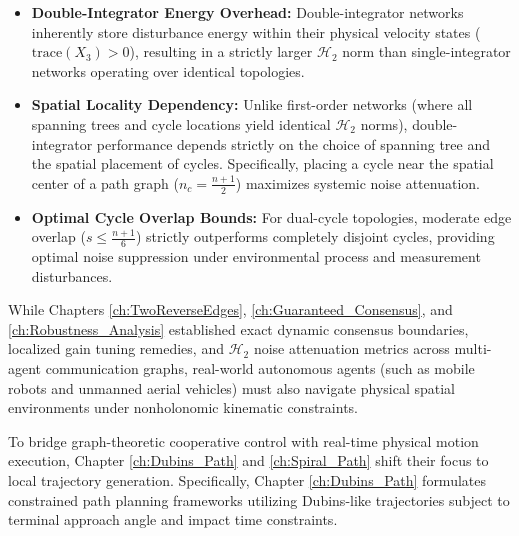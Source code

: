 \begin{itemize}
    \item \textbf{Double-Integrator Energy Overhead:} Double-integrator networks inherently store disturbance energy within their physical velocity states ($\text{trace}(X_3) > 0$), resulting in a strictly larger $\mathcal{H}_2$ norm than single-integrator networks operating over identical topologies.
    \item \textbf{Spatial Locality Dependency:} Unlike first-order networks (where all spanning trees and cycle locations yield identical $\mathcal{H}_2$ norms), double-integrator performance depends strictly on the choice of spanning tree and the spatial placement of cycles. Specifically, placing a cycle near the spatial center of a path graph ($n_c = \frac{n+1}{2}$) maximizes systemic noise attenuation.
    \item \textbf{Optimal Cycle Overlap Bounds:} For dual-cycle topologies, moderate edge overlap ($s \le \frac{n+1}{6}$) strictly outperforms completely disjoint cycles, providing optimal noise suppression under environmental process and measurement disturbances.
\end{itemize}
\vspace{0.5em}
\noindent %
While Chapters \ref{ch:TwoReverseEdges}, \ref{ch:Guaranteed_Consensus}, and \ref{ch:Robustness_Analysis} established exact dynamic consensus boundaries, localized gain tuning remedies, and $\mathcal{H}_2$ noise attenuation metrics across multi-agent communication graphs, real-world autonomous agents (such as mobile robots and unmanned aerial vehicles) must also navigate physical spatial environments under nonholonomic kinematic constraints.

To bridge graph-theoretic cooperative control with real-time physical motion execution, Chapter \ref{ch:Dubins_Path} and \ref{ch:Spiral_Path} shift their focus to local trajectory generation. Specifically, Chapter \ref{ch:Dubins_Path} formulates constrained path planning frameworks utilizing Dubins-like trajectories subject to terminal approach angle and impact time constraints.
